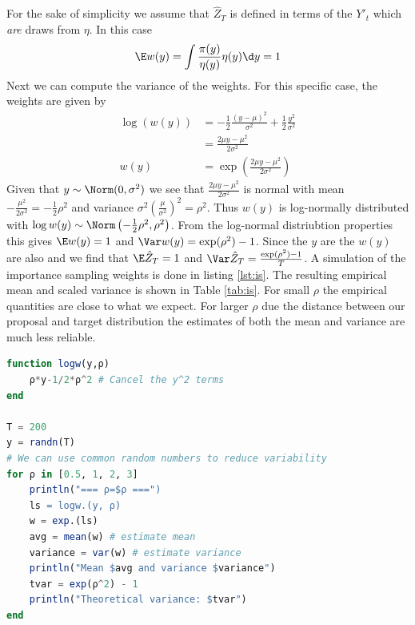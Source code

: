 \documentclass{article}
\begin{document}
\begin{enumerate}
    For the sake of
    simplicity we assume that $\hat Z_T$ 
    is defined in terms of the $Y'_t$ which \emph{are} \iid draws from 
    $\eta$. In this case
    \[
        \E w(y) = \int \frac{\pi(y)}{\eta(y)}\eta(y) \d y = 1
    \]
    Next we can compute the variance of the weights.  For
    this specific case, the weights are given by 
    \begin{align}
        \log(w(y)) &= -\frac 1 2 \frac{(y-\mu)^2}{\sigma^2} + \frac 1 2 \frac{y^2}{\sigma^2} \\
        &= \frac{2\mu y - \mu^2}{2\sigma^2} \\
        w(y) &= \exp\left(\frac{2\mu y - \mu^2}{2\sigma^2}\right)
    \end{align}
    Given that $y \sim \Norm(0, \sigma^2)$ we see that 
    $\frac{2\mu y - \mu^2}{2\sigma^2}$ is normal with mean 
    $-\frac{\mu^2}{2\sigma^2} = -\frac 1 2 \rho^2$ and variance
    $\sigma^2 \left( \frac{\mu}{\sigma^2} \right)^2 = \rho^2$. Thus
    $w(y)$ is log-normally distributed with $\log w(y) \sim \Norm\left(-\frac 1 2 \rho^2, \rho^2 \right)$.
    From the log-normal distriubtion properties this gives
        $\E w(y) = 1$ and $\Var w(y)= \exp(\rho^2) - 1$.
    Since the $y$ are \iid the $w(y)$ are also \iid and we find that
    $\E \hat Z_T = 1$ and $\Var \hat Z_T = \frac {\exp(\rho^2) - 1} T$.
    A simulation of the importance sampling weights is done in
    listing \ref{lst:is}. The resulting empirical mean and scaled variance is shown in 
    Table \ref{tab:is}. For small $\rho$ the empirical quantities are close
    to what we expect. For larger $\rho$ due the distance between our
    proposal and target distribution the estimates of both the mean and variance
    are much less reliable.

\begin{lstlisting}[language=Julia, caption={Importance Sampling Estimate of Normalizing Constant},
    label={lst:is}]
function logw(y,ρ)
    ρ*y-1/2*ρ^2 # Cancel the y^2 terms
end

T = 200
y = randn(T)
# We can use common random numbers to reduce variability
for ρ in [0.5, 1, 2, 3]
    println("=== ρ=$ρ ===")
    ls = logw.(y, ρ)
    w = exp.(ls)
    avg = mean(w) # estimate mean
    variance = var(w) # estimate variance
    println("Mean $avg and variance $variance")
    tvar = exp(ρ^2) - 1
    println("Theoretical variance: $tvar")
end
\end{lstlisting}

\begin{table}[h]
\centering
{}
\caption{Mean and Variance of Importance Sampling Estimates of Normalizing
Constant. The true value is $1$. Variances are scaled by $T$, the number of
samples.}
\label{tab:is}
\end{table}


\end{enumerate}
\end{document}
